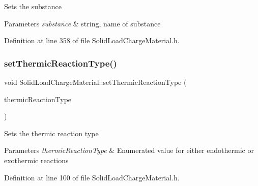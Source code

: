 Sets the substance 
\begin{DoxyParams}{Parameters}
{\em substance} & string, name of substance \\
\hline
\end{DoxyParams}


Definition at line 358 of file Solid\+Load\+Charge\+Material.\+h.

\mbox{\label{class_solid_load_charge_material_ae2f85e0fbeff9f72b808bf86e645797f}} 
\subsubsection{\texorpdfstring{set\+Thermic\+Reaction\+Type()}{setThermicReactionType()}\hspace{0.1cm}{\footnotesize\ttfamily [1/3]}}
{\footnotesize\ttfamily void Solid\+Load\+Charge\+Material\+::set\+Thermic\+Reaction\+Type (\begin{DoxyParamCaption}\item[{\hyperlink{class_load_charge_material_a51d4263e865a5d86236622dd3fe23fd1}{Load\+Charge\+Material\+::\+Thermic\+Reaction\+Type}}]{thermic\+Reaction\+Type }\end{DoxyParamCaption})\hspace{0.3cm}{\ttfamily [inline]}}

Sets the thermic reaction type 
\begin{DoxyParams}{Parameters}
{\em thermic\+Reaction\+Type} & Enumerated value for either endothermic or exothermic reactions \\
\hline
\end{DoxyParams}


Definition at line 100 of file Solid\+Load\+Charge\+Material.\+h.

\mbox{\label{class_solid_load_charge_material_ae2f85e0fbeff9f72b808bf86e645797f}} 
